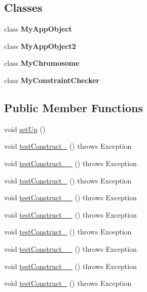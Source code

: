 \subsection*{Classes}
\begin{DoxyCompactItemize}
\item 
class {\bfseries My\-App\-Object}
\item 
class {\bfseries My\-App\-Object2}
\item 
class {\bfseries My\-Chromosome}
\item 
class {\bfseries My\-Constraint\-Checker}
\end{DoxyCompactItemize}
\subsection*{Public Member Functions}
\begin{DoxyCompactItemize}
\item 
void \hyperlink{classorg_1_1jgap_1_1_chromosome_test_a3e32c16e26f7ed527b96d4fe205295ca}{set\-Up} ()
\item 
void \hyperlink{classorg_1_1jgap_1_1_chromosome_test_a87842a66f88c016c20f7576b76b1313b}{test\-Construct\-\_} ()  throws Exception 
\item 
void \hyperlink{classorg_1_1jgap_1_1_chromosome_test_a0bcb2fa9efd025d4ab767c1b632ecb6a}{test\-Construct\-\_\-\_} ()  throws Exception 
\item 
void \hyperlink{classorg_1_1jgap_1_1_chromosome_test_a5f8b402af5ae5c5a35e062009d7b8323}{test\-Construct\-\_} ()  throws Exception 
\item 
void \hyperlink{classorg_1_1jgap_1_1_chromosome_test_a808fcbe4d93593b24614fcbed7a25dfc}{test\-Construct\-\_\-\_} ()  throws Exception 
\item 
void \hyperlink{classorg_1_1jgap_1_1_chromosome_test_aba93245e2e55e4e9d26a6549adf4c434}{test\-Construct\-\_\-\_} ()  throws Exception 
\item 
void \hyperlink{classorg_1_1jgap_1_1_chromosome_test_aebfa2beb4bdaa04617a3315ff47800d2}{test\-Construct\-\_} ()  throws Exception 
\item 
void \hyperlink{classorg_1_1jgap_1_1_chromosome_test_a6789b1c4918241b833d7078c35564820}{test\-Construct\-\_\-\_} ()  throws Exception 
\item 
void \hyperlink{classorg_1_1jgap_1_1_chromosome_test_ae3147db60782c3e9b7f21778657af7ef}{test\-Construct\-\_\-\_} ()  throws Exception 
\item 
void \hyperlink{classorg_1_1jgap_1_1_chromosome_test_a156a5721cf5cc22c13c75a9bf4ec3c41}{test\-Construct\-\_} ()  throws Exception 

\end{DoxyCompactItemize}
